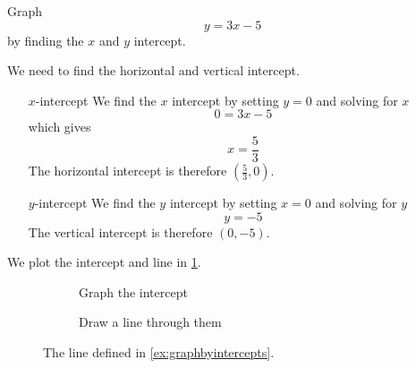 \begin{myexample}\label{ex:graphbyintercepts}
Graph 
\[
	y = 3x - 5
\]
by finding the $x$ and $y$ intercept.
\end{myexample}
\begin{myProof}
	We need to find the horizontal and vertical intercept. 
	\begin{itemize}[leftmargin=4cm]
		\item[$x$-intercept]
		We find the $x$ intercept by setting $y=0$ and solving for $x$
		\[
			0 = 3 x - 5
		\]
		which gives 
		\[
			x = \frac{5}{3}
		\]
		The horizontal intercept is therefore $\left(\frac{5}{3},0\right)$.
		\item[$y$-intercept]
		We find the $y$ intercept by setting $x=0$ and solving for $y$
		\[
			y = -5
		\]
		The vertical intercept is therefore $(0,-5)$. 
	\end{itemize} 
	We plot the intercept  and line in \cref{fig:graphintercepts}.
	\begin{figure}
		\begin{subfigure}{.5\textwidth}
			\centering
			\caption{Graph the intercept}
		\end{subfigure}
		\begin{subfigure}{.5\textwidth}
			\centering
			\caption{Draw a line through them}
		\end{subfigure}
		\caption{The line defined in \cref{ex:graphbyintercepts}.}
		\label{fig:graphintercepts}
	\end{figure}
																																								
	\mbox{}
\end{myProof} 
																													
